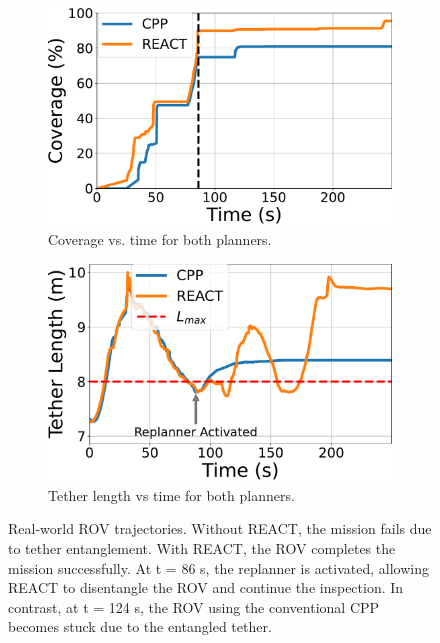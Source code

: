 \begin{figure}[t]
    \centering
    \begin{subfigure}[b]{0.44\linewidth}
        \centering
        \includegraphics[width=\linewidth]{figures/dfki_coverage_comparison_plot.pdf}
        \caption{ Coverage vs. time for both planners.}
        \label{fig:traj_noreact}
    \end{subfigure}
    \hfill
    \begin{subfigure}[b]{0.44\linewidth}
        \centering
        \includegraphics[width=\linewidth]{figures/dfki_tether_length_vs_time.pdf}
        \caption{Tether length vs time for both planners.}
        \label{fig:traj_react}
    \end{subfigure}
    \caption{Real-world ROV trajectories. Without \ac{REACT}, the mission fails due to tether entanglement. With \ac{REACT}, the ROV completes the mission successfully. At t = 86 s, the replanner is activated, allowing \ac{REACT} to disentangle the \ac{ROV} and continue the inspection. In contrast, at t = 124 s, the \ac{ROV} using the conventional \ac{CPP} becomes stuck due to the entangled tether.}
    \label{fig:realworld_trajectory}
\end{figure}
